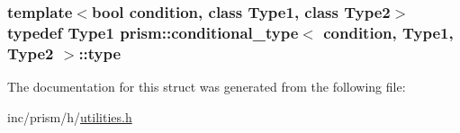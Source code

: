 \subsubsection[{\texorpdfstring{type}{type}}]{\setlength{\rightskip}{0pt plus 5cm}template$<$bool condition, class Type1, class Type2$>$ typedef Type1 {\bf prism\+::conditional\+\_\+type}$<$ condition, Type1, Type2 $>$\+::{\bf type}}\hypertarget{structprism_1_1conditional__type_a9d57ba7c29ee017e38e49bbb72229b7e}{}\label{structprism_1_1conditional__type_a9d57ba7c29ee017e38e49bbb72229b7e}


The documentation for this struct was generated from the following file\+:\begin{DoxyCompactItemize}
\item 
inc/prism/h/\hyperlink{utilities_8h}{utilities.\+h}\end{DoxyCompactItemize}
